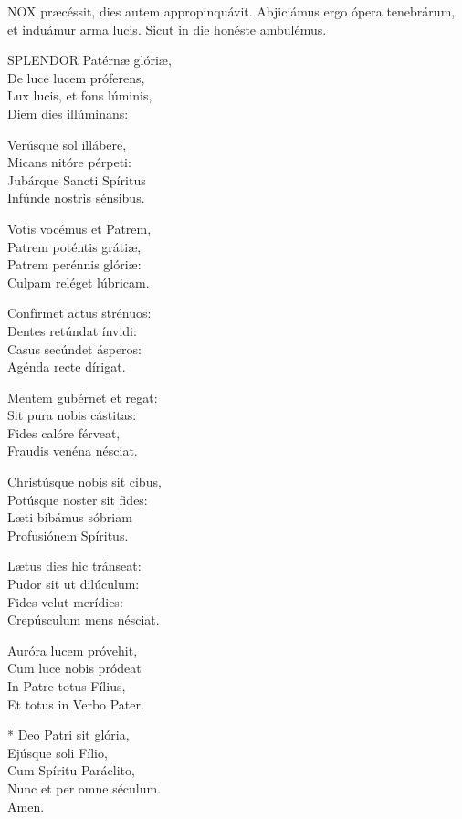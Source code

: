 

\lettrine[lines=2]{N}{OX} præcéssit, dies autem appropinquávit. Abjiciámus ergo ópera tenebrárum, et induámur arma lucis. Sicut in die honéste ambulémus.


\lettrine[lines=2]{S}{PLENDOR} Patérnæ glóriæ,\\
De luce lucem próferens,\\
Lux lucis, et fons lúminis,\\
Diem dies illúminans:

Verúsque sol illábere,\\
Micans nitóre pérpeti:\\
Jubárque Sancti Spíritus\\
Infúnde nostris sénsibus.

Votis vocémus et Patrem,\\
Patrem poténtis grátiæ,\\
Patrem perénnis glóriæ:\\
Culpam reléget lúbricam.

Confírmet actus strénuos:\\
Dentes retúndat ínvidi:\\
Casus secúndet ásperos:\\
Agénda recte dírigat.

Mentem gubérnet et regat:\\
Sit pura nobis cástitas:\\
Fides calóre férveat,\\
Fraudis venéna nésciat.

Christúsque nobis sit cibus,\\
Potúsque noster sit fides:\\
Læti bibámus sóbriam\\
Profusiónem Spíritus.

Lætus dies hic tránseat:\\
Pudor sit ut dilúculum:\\
Fides velut merídies:\\
Crepúsculum mens nésciat.

Auróra lucem próvehit,\\
Cum luce nobis pródeat\\
In Patre totus Fílius,\\
Et totus in Verbo Pater.

* Deo Patri sit glória,\\
Ejúsque soli Fílio,\\
Cum Spíritu Paráclito,\\
Nunc et per omne séculum.\\
Amen.

